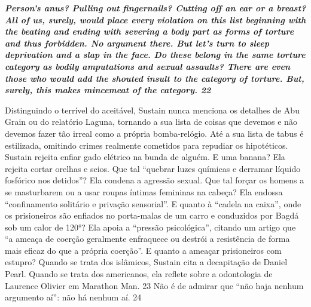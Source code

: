  
\par
 

 \textbf{\textit{Person’s anus? Pulling out fingernails? Cutting off an ear or a breast? All of us, surely, would place every violation on this list beginning with the beating and ending with severing a body part as forms of torture and thus forbidden. No argument there. But let’s turn to sleep deprivation and a slap in the face. Do these belong in the same torture category as bodily amputations and sexual assaults? There are even those who would add the shouted insult to the category of torture. But, surely, this makes mincemeat of the category. {{\color{blue} 22} } } }  
 
 
\par
 
Distinguindo o terrível do aceitável, Sustain nunca menciona os detalhes de Abu Grain ou do relatório Laguna, tornando a sua lista de coisas que devemos e não devemos fazer tão irreal como a própria bomba-relógio. Até a sua lista de tabus é estilizada, omitindo crimes realmente cometidos para repudiar os hipotéticos. Sustain rejeita enfiar gado elétrico na bunda de alguém. E uma banana? Ela rejeita cortar orelhas e seios. Que tal “quebrar luzes químicas e derramar líquido fosfórico nos detidos”? Ela condena a agressão sexual. Que tal forçar os homens a se masturbarem ou a usar roupas íntimas femininas na cabeça? Ela endossa “confinamento solitário e privação sensorial”. E quanto à “cadela na caixa”, onde os prisioneiros são enfiados no porta-malas de um carro e conduzidos por Bagdá sob um calor de 120°? Ela apoia a “pressão psicológica”, citando um artigo que “a ameaça de coerção geralmente enfraquece ou destrói a resistência de forma mais eficaz do que a própria coerção”. E quanto a ameaçar prisioneiros com estupro? Quando se trata dos islâmicos, Sustain cita a decapitação de Daniel Pearl. Quando se trata dos americanos, ela reflete sobre a odontologia de Laurence Olivier em Marathon Man.
 {\color{blue} 23}  
Não é de admirar que “não haja nenhum argumento aí”: não há nenhum aí.
 {\color{blue} 24}  

 
\par
 
